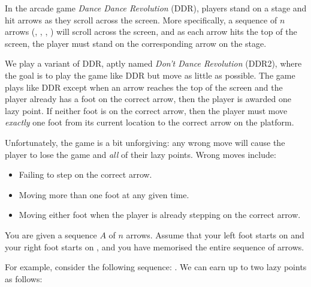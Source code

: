 \documentclass{article}
\begin{document}
\begin{question}
In the arcade game {\em Dance Dance Revolution} (DDR), players stand on a stage and hit arrows as they scroll across the screen. More specifically, a sequence of $n$ arrows (, , , ) will scroll across the screen, and as each arrow hits the top of the screen, the player must stand on the corresponding arrow on the stage.

We play a variant of DDR, aptly named {\em Don't Dance Revolution} (DDR2), where the goal is to play the game like DDR but move as little as possible. The game plays like DDR except when an arrow reaches the top of the screen and the player already has a foot on the correct arrow, then the player is awarded one lazy point. If neither foot is on the correct arrow, then the player must move {\em exactly} one foot from its current location to the correct arrow on the platform.

Unfortunately, the game is a bit unforgiving: any wrong move will cause the player to lose the game and {\em all} of their lazy points. Wrong moves include:
\begin{itemize}
    \item Failing to step on the correct arrow.
    \item Moving more than one foot at any given time.
    \item Moving either foot when the player is already stepping on the correct arrow.
\end{itemize}

You are given a sequence $A$ of $n$ arrows. Assume that your left foot starts on  and your right foot starts on , and you have memorised the entire sequence of arrows.

For example, consider the following sequence:    . We can earn up to two lazy points as follows:

\begin{center}
\end{center}
\end{question}
\end{document}
